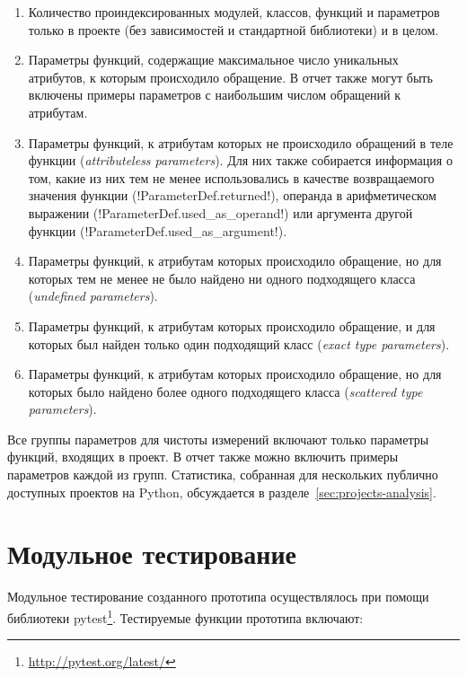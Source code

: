 \begin{enumerate}
  \item Количество проиндексированных модулей, классов, функций и параметров
    только в проекте (без зависимостей и стандартной библиотеки) и в целом.

  \item Параметры функций, содержащие максимальное число уникальных атрибутов, к
    которым происходило обращение. В отчет также могут быть включены примеры
    параметров с наибольшим числом обращений к атрибутам.

  \item Параметры функций, к атрибутам которых не происходило обращений в теле
    функции (\emph{attributeless parameters}). Для них также
    собирается информация о том, какие из них тем не менее использовались в
    качестве возвращаемого значения функции (!ParameterDef.returned!), операнда
    в арифметическом выражении (!ParameterDef.used_as_operand!) или аргумента
    другой функции (!ParameterDef.used_as_argument!).

  \item Параметры функций, к атрибутам которых происходило обращение, но для
    которых тем не менее не было найдено ни одного подходящего класса
    (\emph{undefined parameters}).

  \item Параметры функций, к атрибутам которых происходило обращение, и для
    которых был найден только один подходящий класс (\emph{exact type parameters}).

  \item Параметры функций, к атрибутам которых происходило обращение, но для
    которых было найдено более одного подходящего класса (\emph{scattered type
      parameters}).

\end{enumerate}

Все группы параметров для чистоты измерений включают только параметры функций,
входящих в проект. В отчет также можно включить примеры параметров каждой из групп.
Статистика, собранная для нескольких публично доступных проектов на Python, обсуждается
в разделе~\ref{sec:projects-analysis}.

\section{Модульное тестирование}
\label{sec:unit-testing}

Модульное тестирование созданного прототипа осуществлялось при помощи библиотеки
pytest\footnote{\url{http://pytest.org/latest/}}.  Тестируемые функции прототипа
включают:

